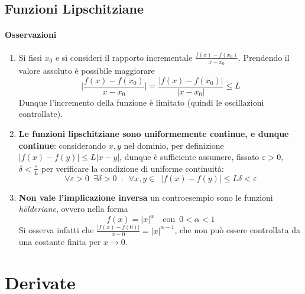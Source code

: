 \documentclass[10pt]{article}
\theoremstyle{plain}
\begin{document}
\subsection{Funzioni Lipschitziane}
\paragraph{Osservazioni}
\begin{enumerate}
\item Si fissi $x_0$ e si consideri il rapporto incrementale $\displaystyle \frac{f(x) - f(x_0)}{x - x_0}$. Prendendo il valore assoluto è possibile maggiorare
\[\bigg|\frac{f(x) - f(x_0)}{x - x_0}\bigg| = \frac{|f(x) - f(x_0)|}{|x - x_0|} \leq L\]
Dunque l'incremento della funzione è limitato (quindi le oscillazioni controllate).
\item \textbf{Le funzioni lipschitziane sono uniformemente continue, e dunque continue}: considerando $x,y$ nel dominio, per definizione $|f(x) - f(y)| \leq L |x - y|$, dunque è sufficiente assumere, fissato $\varepsilon >0$, $\displaystyle \delta < \frac{\varepsilon}{L}$ per verificare la condizione di uniforme continuità:
\[\forall \varepsilon > 0 \enspace \exists \delta > 0 \enspace : \enspace \forall x,y \in  \enspace |f(x) - f(y)| \leq L\delta < \varepsilon\]
\item \textbf{Non vale l'implicazione inversa} un controesempio sono le funzioni \textit{h\"olderiane}, ovvero nella forma
\[f(x) = |x|^\alpha \quad \textrm{con} \enspace 0 < \alpha < 1\]
Si osserva infatti che $\displaystyle \frac{|f(x) - f(0)|}{x - 0} = |x|^{\alpha - 1}$, che non può essere controllata da una costante finita per $x \rightarrow 0$.
\end{enumerate}



\section{Derivate}
\end{document}

